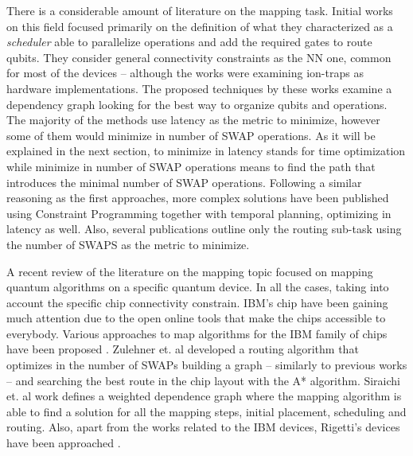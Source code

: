 There is a considerable amount of literature on the mapping task.
Initial works on this field \cite{Metodi_2006,Whitney_2007,Bahreini_2015} focused primarily on the definition of what they characterized as a \emph{scheduler} able to parallelize operations and add the required gates to route qubits.
They consider general connectivity constraints as the NN one, common for most of the devices -- although the works were examining ion-traps as hardware implementations.
The proposed techniques by these works examine a dependency graph looking for the best way to organize qubits and operations.
The majority of the methods use latency as the metric to minimize, however some of them \cite{Farghadan_2017} would minimize in number of SWAP operations.
As it will be explained in the next section, to minimize in latency stands for time optimization while minimize in number of SWAP operations means to find the path that introduces the minimal number of SWAP operations.
Following a similar reasoning as the first approaches, more complex solutions \cite{booth18:compar_integ_const_progr_tempor} have been published using Constraint Programming together with temporal planning, optimizing in latency as well.
Also, several publications \cite{Lye_2015,Wille_2016} outline only the routing sub-task using the number of SWAPS as the metric to minimize.

A recent review of the literature on the mapping topic focused on mapping quantum algorithms on a specific quantum device.
In all the cases, taking into account the specific chip connectivity constrain.
IBM's chip have been gaining much attention due to the open online tools that make the chips accessible to everybody.
Various approaches to map algorithms for the IBM family of chips have been proposed \cite{zulehner17:effic_method_mappin_quant_circuit,Siraichi_2018,mckay18:qiskit_backen_specif_openq_openp_exper,Dueck_2018}.
Zulehner et. al \cite{zulehner17:effic_method_mappin_quant_circuit} developed a routing algorithm that optimizes in the number of SWAPs building a graph -- similarly to previous works --  and searching the best route in the chip layout with the A* algorithm.
Siraichi et. al \cite{Siraichi_2018} work defines a weighted dependence graph where the mapping algorithm is able to find a solution for all the mapping steps, initial placement, scheduling and routing.
Also, apart from the works related to the IBM devices, Rigetti's devices have been approached \cite{Venturelli_2018}.

